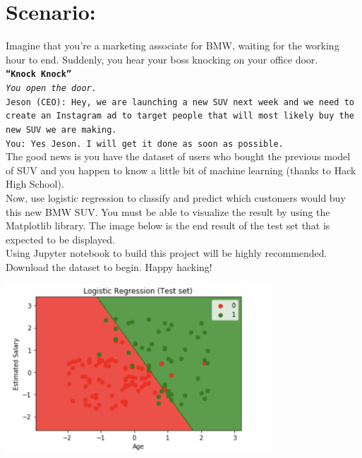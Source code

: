 \documentclass{42-en}
\begin{document}
\section*{Scenario:}
Imagine that you’re a marketing associate for BMW, waiting for the working hour to end. Suddenly, you hear your boss knocking on your office door.\\
\texttt{\textbf{“Knock Knock”}\\
\textit{You open the door.}\\
Jeson (CEO): Hey, we are launching a new SUV next week and we need to create an Instagram ad to target people that will most likely buy the new SUV we are making.\\
You: Yes Jeson. I will get it done as soon as possible.\\}
The good news is you have the dataset of users who bought the previous model of SUV and you happen to know a little bit of machine learning (thanks to Hack High School).\\
Now, use logistic regression to classify and predict which customers would buy this new BMW SUV. You must be able to visualize the result by using the Matplotlib library. The image below is the end result of the test set that is expected to be displayed.\\
Using Jupyter notebook to build this project will be highly recommended. Download the dataset to begin. Happy hacking!\\


\centerline{\includegraphics[width=100mm]{images/lr_testset.png}}

\nextexercice
\newpage

\end{document}
